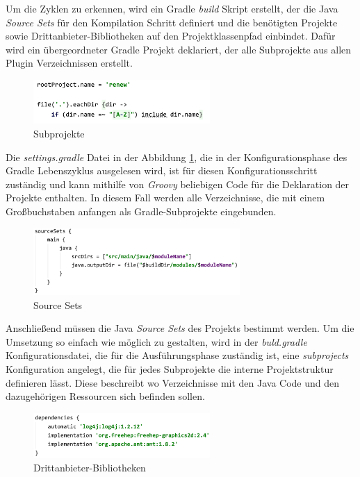  	Um die Zyklen zu erkennen, wird ein Gradle \textit{build} Skript erstellt, der die Java \textit{Source Sets} für den Kompilation Schritt definiert und die benötigten Projekte sowie Drittanbieter-Bibliotheken auf den Projektklassenpfad einbindet. Dafür wird ein übergeordneter Gradle Projekt deklariert, der alle Subprojekte aus allen Plugin Verzeichnissen erstellt. \bigbreak

	\begin{figure}[h!]
	  \centering
	  \includegraphics[width=0.6\textwidth]{material/images/settings_gradle.png}
	  \caption{Subprojekte}
	  \label{fig:subprojekte}
	\end{figure}

 	Die \textit{settings.gradle} Datei in der Abbildung \ref{fig:subprojekte}, die in der Konfigurationsphase des Gradle Lebenszyklus ausgelesen wird, ist für diesen Konfigurationsschritt zuständig und kann mithilfe von \textit{Groovy} beliebigen Code für die Deklaration der Projekte enthalten. In diesem Fall werden alle Verzeichnisse, die mit einem Großbuchstaben anfangen als Gradle-Subprojekte eingebunden.\bigbreak

	\begin{figure}[h!]
	  \centering
	  \includegraphics[width=0.7\textwidth]{material/images/sourceSets.png}
	  \caption{Source Sets}
	  \label{fig:Source_Sets}
	\end{figure}

 	Anschließend müssen die Java \textit{Source Sets} des Projekts bestimmt werden. Um die Umsetzung so einfach wie möglich zu gestalten, wird in der \textit{buld.gradle} Konfigurationsdatei, die für die Ausführungsphase zuständig ist, eine \textit{subprojects} Konfiguration angelegt, die für jedes Subprojekte die interne Projektstruktur definieren lässt. Diese beschreibt wo Verzeichnisse mit den Java Code und den dazugehörigen Ressourcen sich befinden sollen.\bigbreak

	\begin{figure}[h!]
	  \centering
	  \includegraphics[width=0.6\textwidth]{material/images/dep_global.png}
	  \caption{Drittanbieter-Bibliotheken}
	  \label{fig:deps}
	\end{figure}

